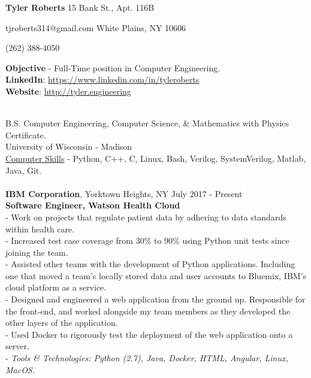 \documentclass{resume}
\begin{document}
\begin{adjustwidth}{75mm}{}
{\LARGE \bf Tyler Roberts} \hfill 15 Bank St., Apt. 116B
\end{adjustwidth}
\begin{adjustwidth}{80mm}{}
{\normalsize tjroberts314@gmail.com} \hfill White Plains, NY 10606
\end{adjustwidth}
\begin{adjustwidth}{87.5mm}{}
{\normalsize (262) 388-4050}
\end{adjustwidth}
\begin{flushleft}
	\textbf{Objective} - Full-Time position in Computer Engineering. \\
	\textbf{LinkedIn}:
	\href{https://www.linkedin.com/in/tyleroberts}{https://www.linkedin.com/in/tyleroberts} \\
	\textbf{Website}:
	\href{http://tyler.engineering}{http://tyler.engineering} \vspace{\baselineskip}

 \\
{\bigsize
B.S. Computer Engineering, Computer Science, \& Mathematics with Physics Certificate. \\
University of Wisconsin - Madison \\
\underline{Computer Skills} - Python, C++, C, Linux, Bash, Verilog, SystemVerilog, Matlab, Java, Git.} \\[5mm]
\\[2mm]

\textbf{IBM Corporation}, Yorktown Heights, NY \hfill July 2017 - Present\\
\textbf{Software Engineer, Watson Health Cloud}\\
{\footnotesize
	\ttab- Work on projects that regulate patient data by adhering to data standards within health care.\\
	\ttab- Increased test case coverage from 30\% to 90\% using Python unit tests since joining the team. \\
	\ttab- Assisted other teams with the development of Python applications. Including one that moved a team's locally stored data
	\ttab and user accounts to Bluemix, IBM's cloud platform as a service. \\
	\ttab- Designed and engineered a web application from the ground up. Responsible for the front-end, and worked alongside \ttab my team members as they developed the other layers of the application. \\
	\ttab - Used Docker to rigorously test the deployment of the web application onto a server. \\
	\ttab- \textit{Tools \& Technologies: Python (2.7), Java, Docker, HTML, Angular, Linux, MacOS.}\\[3mm]
}


\end{flushleft}
\end{document}
